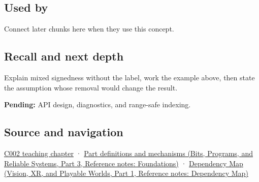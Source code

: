 \subsection{Used by}\label{appendix-736a2345de4a-used-by}

\hypertarget{appendix-736a2345de4a-used-by}{}

Connect later chunks here when they use this concept.

\subsection{Recall and next depth}\label{appendix-736a2345de4a-recall-and-next-depth}

\hypertarget{appendix-736a2345de4a-recall-and-next-depth}{}

Explain mixed signedness without the label, work the example above, then state the assumption whose removal would change the result.

\textbf{Pending:} API design, diagnostics, and range-safe indexing.

\subsection{Source and navigation}\label{appendix-736a2345de4a-source-and-navigation}

\hypertarget{appendix-736a2345de4a-source-and-navigation}{}

\hyperref[01-foundations-i-ch001-arithmetic-becomes-a-policy]{C002 teaching chapter} · \href{../01-Bits-Programs-and-Reliable-Systems-P03/main.pdf\#nameddest=appendix-fd090d982a15}{Part definitions and mechanisms (Bits, Programs, and Reliable Systems, Part 3, Reference notes: Foundations)} · \href{../07-Vision-XR-and-Playable-Worlds-P01/main.pdf\#nameddest=appendix-4ad47bdd269a}{Dependency Map (Vision, XR, and Playable Worlds, Part 1, Reference notes: Dependency Map)}
